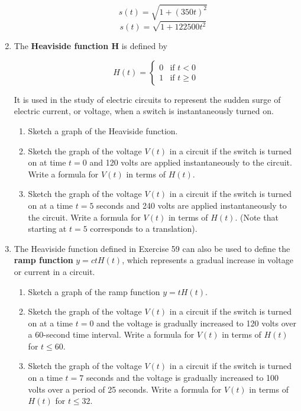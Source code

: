 \documentclass{article}
\begin{document}
\begin{enumerate}
\begin{enumerate}
				$$s(t) = \sqrt{1 + (350t)^2}$$
				$$s(t) = \sqrt{1 + 122500t^2}$$
		\end{enumerate}
		
		\item The \textbf{Heaviside function H} is defined by
		
\begin{displaymath}
   H(t) = \left\{
     \begin{array}{lr}
       0 & \text{if } t < 0\\
       1 &  \text{if } t \geq 0
     \end{array}
   \right.
\end{displaymath} 

		It is used in the study of electric circuits to represent the sudden surge of electric current, or voltage, when
		a switch is instantaneously turned on.
		
		\begin{enumerate}
		
			\item Sketch a graph of the Heaviside function.
			
			\item Sketch the graph of the voltage $V(t)$ in a circuit if the switch is turned on at time $t = 0$ and 
				120 volts are applied instantaneously to the circuit. Write a formula for $V(t)$ in terms of $H(t)$.
				
			\item Sketch the graph of the voltage $V(t)$ in a circuit if the switch is turned on at a time $t = 5$ seconds
				and 240 volts are applied instantaneously to the circuit. Write a formula for $V(t)$ in terms of $H(t)$.
				(Note that starting at $t = 5$ corresponds to a translation).
		\end{enumerate}
		
		\item The Heaviside function defined in Exercise 59 can also be used to define the \textbf{ramp function} $y = ctH(t)$,
			which represents a gradual increase in voltage or current in a circuit.
			
		\begin{enumerate}
		
			\item Sketch a graph of the ramp function $y = tH(t)$.
			
			\item Sketch the graph of the voltage $V(t)$ in a circuit if the switch is turned on at a time $t = 0$ and the
				voltage is gradually increased to 120 volts over a 60-second time interval. Write a formula for
				$V(t)$ in terms of $H(t)$ for $t \leq 60$.
				
			\item Sketch the graph of the voltage $V(t)$ in a circuit if the switch is turned on a time $t = 7$ seconds
				and the voltage is gradually increased to 100 volts over a period of 25 seconds. Write a formula
				for $V(t)$ in terms of $H(t)$ for $t \leq 32$.
		\end{enumerate}
	\end{enumerate}
\end{document}
